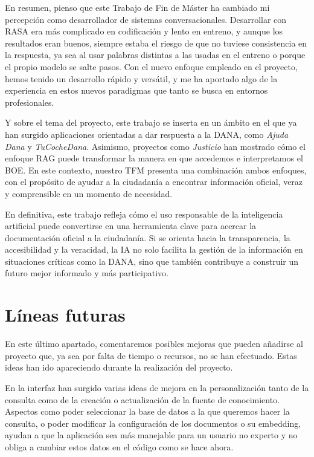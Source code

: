 		\noindent En resumen, pienso que este Trabajo de Fin de Máster ha cambiado mi percepción como desarrollador de sistemas conversacionales. Desarrollar con RASA era más complicado en codificación y lento en entreno, y aunque los resultados eran buenos, siempre estaba el riesgo de que no tuviese consistencia en la respuesta, ya sea al usar palabras distintas a las usadas en el entreno o porque el propio modelo se salte pasos. Con el nuevo enfoque empleado en el proyecto, hemos tenido un desarrollo rápido y versátil, y me ha aportado algo de la experiencia en estos nuevos paradigmas que tanto se busca en entornos profesionales.
		
		\noindent Y sobre el tema del proyecto, este trabajo se inserta en un ámbito en el que ya han surgido aplicaciones orientadas a dar respuesta a la DANA, como \textit{Ajuda Dana} y \textit{TuCocheDana}. Asimismo, proyectos como \textit{Justicio} han mostrado cómo el enfoque RAG puede transformar la manera en que accedemos e interpretamos el BOE. En este contexto, nuestro TFM presenta una combinación ambos enfoques, con el propósito de ayudar a la ciudadanía a encontrar información oficial, veraz y comprensible en un momento de necesidad.
		
		\noindent En definitiva, este trabajo refleja cómo el uso responsable de la inteligencia artificial puede convertirse en una herramienta clave para acercar la documentación oficial a la ciudadanía. Si se orienta hacia la transparencia, la accesibilidad y la veracidad, la IA no solo facilita la gestión de la información en situaciones críticas como la DANA, sino que también contribuye a construir un futuro mejor informado y más participativo.
	
	\section{Líneas futuras}
	
		En este último apartado, comentaremos posibles mejoras que pueden añadirse al proyecto que, ya sea por falta de tiempo o recursos, no se han efectuado. Estas ideas han ido apareciendo durante la realización del proyecto.
		
		\noindent En la interfaz han surgido varias ideas de mejora en la personalización tanto  de la consulta como de la creación o actualización de la fuente de conocimiento. Aspectos como poder seleccionar la base de datos a la que queremos hacer la consulta, o poder modificar la configuración de los documentos o su embedding, ayudan a que la aplicación sea más manejable para un usuario no experto y no obliga a cambiar estos datos en el código como se hace ahora.
	
